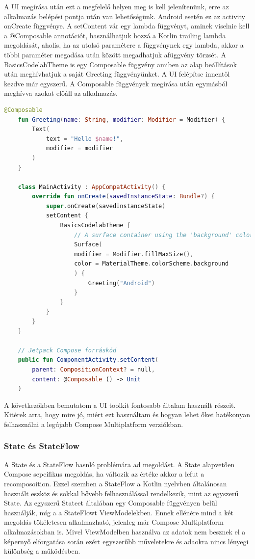 A UI megírása után ezt a megfelelő helyen meg is kell jelenítenünk, erre az alkalmazás belépési pontja után van lehetőségünk.
Android esetén ez az activity onCreate függvénye.
A setContent vár egy lambda függvényt, aminek viselnie kell a @Composable annotációt, használhatjuk hozzá a Kotlin trailing lambda megoldását, aholis, ha az utolsó paramétere a függvénynek egy lambda, akkor a többi paraméter megadása után {} között megadhatjuk afüggvény törzsét.
A BasicsCodelabTheme is egy Composable függvény amiben az alap beállítások után meghívhatjuk a saját Greeting függvényünket.
A UI felépítse innentől kezdve már egyszerű.
A Composable függvények megírása után egymásból meghívva azokat előáll az alkalmazás.

\begin{lstlisting}[caption={Példa a Compose használatára.}, label={lst:compose}, language=Kotlin]
    @Composable
    fun Greeting(name: String, modifier: Modifier = Modifier) {
        Text(
            text = "Hello $name!",
            modifier = modifier
        )
    }

    class MainActivity : AppCompatActivity() {
        override fun onCreate(savedInstanceState: Bundle?) {
            super.onCreate(savedInstanceState)
            setContent {
                BasicsCodelabTheme {
                    // A surface container using the 'background' color from the theme
                    Surface(
                    modifier = Modifier.fillMaxSize(),
                    color = MaterialTheme.colorScheme.background
                    ) {
                        Greeting("Android")
                    }
                }
            }
        }
    }

    // Jetpack Compose forráskód
    public fun ComponentActivity.setContent(
        parent: CompositionContext? = null,
        content: @Composable () -> Unit
    )
\end{lstlisting}

A következőkben bemutatom a UI toolkit fontosabb általam használt részeit.
Kitérek arra, hogy mire jó, miért ezt használtam és hogyan lehet őket hatékonyan felhasználni a legújabb Compose Multiplatform verziókban.

\subsubsection{State és StateFlow}
\label{sec:State}

A State és a StateFlow hasnló problémára ad megoldást.
A State alapvetően Compose sepcifikus megoldás, ha változik az értéke akkor a lefut a recomposoition.
Ezzel szemben a StateFlow a Kotlin nyelvben általánosan használt eszköz és sokkal bővebb felhasználással rendelkezik, mint az egyszerű State.
Az egyszerű Stateet általában egy Composable függvényen belül használják, míg a a StateFlowt ViewModelekben.
Ennek ellénére mind a két megoldás tökéletesen alkalmazható, jelenleg már Compose Multiplatform alkalmazásokban is.
Mivel ViewModelben használva az adatok nem besznek el a képernyő elforgatása során ezért egyszerűbb műveletekre és adaokra nincs lényegi különbség a működésben. 

